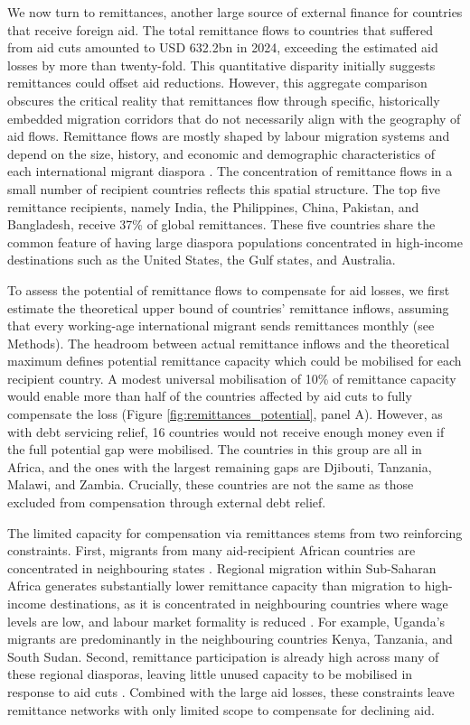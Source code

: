 \documentclass[fleqn,10pt,twocolumn]{wlscirep}
\begin{document}
{
We now turn to remittances, another large source of external finance for countries that receive foreign aid. The total remittance flows to countries that suffered from aid cuts amounted to USD 632.2bn in 2024, exceeding the estimated aid losses by more than twenty-fold. This quantitative disparity initially suggests remittances could offset aid reductions. However, this aggregate comparison obscures the critical reality that remittances flow through specific, historically embedded migration corridors that do not necessarily align with the geography of aid flows. Remittance flows are mostly shaped by labour migration systems and depend on the size, history, and economic and demographic characteristics of each international migrant diaspora \cite{vismara2025migrants}. The concentration of remittance flows in a small number of recipient countries reflects this spatial structure. The top five remittance recipients, namely India, the Philippines, China, Pakistan, and Bangladesh, receive 37\% of global remittances. These five countries share the common feature of having large diaspora populations concentrated in high-income destinations such as the United States, the Gulf states, and Australia.

To assess the potential of remittance flows to compensate for aid losses, we first estimate the theoretical upper bound of countries' remittance inflows, assuming that every working-age international migrant sends remittances monthly (see Methods). The headroom between actual remittance inflows and the theoretical maximum defines potential remittance capacity which could be mobilised for each recipient country. A modest universal mobilisation of 10\% of remittance capacity would enable more than half of the countries affected by aid cuts to fully compensate the loss (Figure \ref{fig:remittances_potential}, panel A). However, as with debt servicing relief, 16 countries would not receive enough money even if the full potential gap were mobilised. The countries in this group are all in Africa, and the ones with the largest remaining gaps are Djibouti, Tanzania, Malawi, and Zambia. Crucially, these countries are not the same as those excluded from compensation through external debt relief.

The limited capacity for compensation via remittances stems from two reinforcing constraints. First, migrants from many aid-recipient African countries are concentrated in neighbouring states \cite{tafani2026most, schewel2023global}. Regional migration within Sub-Saharan Africa generates substantially lower remittance capacity than migration to high-income destinations, as it is concentrated in neighbouring countries where wage levels are low, and labour market formality is reduced \cite{hujo2007south}. For example, Uganda's migrants are predominantly in the neighbouring countries Kenya, Tanzania, and South Sudan. Second, remittance participation is already high across many of these regional diasporas, leaving little unused capacity to be mobilised in response to aid cuts \cite{vismara2025migrants}. Combined with the large aid losses, these constraints leave remittance networks with only limited scope to compensate for declining aid.

}
\end{document}
